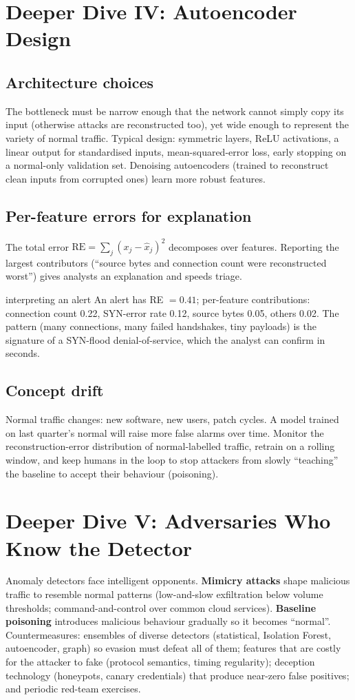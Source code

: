 \documentclass[11pt]{article}
\begin{document}
\section{Deeper Dive IV: Autoencoder Design}
\subsection{Architecture choices}
The bottleneck must be narrow enough that the network cannot simply copy its input (otherwise attacks are reconstructed too), yet wide enough to represent the variety of normal traffic. Typical design: symmetric layers, ReLU activations, a linear output for standardised inputs, mean-squared-error loss, early stopping on a normal-only validation set. Denoising autoencoders (trained to reconstruct clean inputs from corrupted ones) learn more robust features.

\subsection{Per-feature errors for explanation}
The total error $\text{RE}=\sum_j(x_j-\hat x_j)^2$ decomposes over features. Reporting the largest contributors (``source bytes and connection count were reconstructed worst'') gives analysts an explanation and speeds triage.
\begin{example}{interpreting an alert}
An alert has RE $=0.41$; per-feature contributions: connection count 0.22, SYN-error rate 0.12, source bytes 0.05, others 0.02. The pattern (many connections, many failed handshakes, tiny payloads) is the signature of a SYN-flood denial-of-service, which the analyst can confirm in seconds.
\end{example}

\subsection{Concept drift}
Normal traffic changes: new software, new users, patch cycles. A model trained on last quarter's normal will raise more false alarms over time. Monitor the reconstruction-error distribution of normal-labelled traffic, retrain on a rolling window, and keep humans in the loop to stop attackers from slowly ``teaching'' the baseline to accept their behaviour (poisoning).

\section{Deeper Dive V: Adversaries Who Know the Detector}
Anomaly detectors face intelligent opponents. \textbf{Mimicry attacks} shape malicious traffic to resemble normal patterns (low-and-slow exfiltration below volume thresholds; command-and-control over common cloud services). \textbf{Baseline poisoning} introduces malicious behaviour gradually so it becomes ``normal''. Countermeasures: ensembles of diverse detectors (statistical, Isolation Forest, autoencoder, graph) so evasion must defeat all of them; features that are costly for the attacker to fake (protocol semantics, timing regularity); deception technology (honeypots, canary credentials) that produce near-zero false positives; and periodic red-team exercises.
\end{document}
